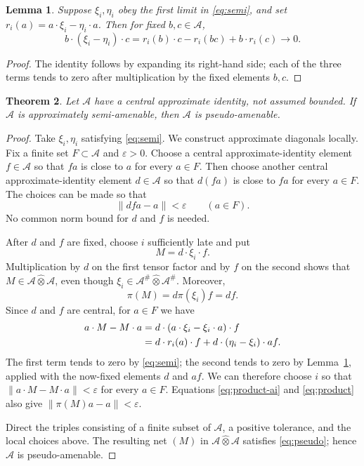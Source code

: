 \documentclass[11pt]{article}
\newtheorem{theorem}{Theorem}[section]
\newtheorem{lemma}[theorem]{Lemma}
\newcommand{\A}{\mathcal A}
\newcommand{\Ah}{\mathcal A^{\#}}
\newcommand{\tp}{\widehat\otimes}
\begin{document}
\begin{lemma}\label{lem:annihilation}
Suppose $\xi_i,\eta_i$ obey the first limit in \eqref{eq:semi}, and set
$r_i(a)=a\cdot\xi_i-\eta_i\cdot a$.  Then for fixed $b,c\in\A$,
\begin{equation}\label{eq:annihilation}
 b\cdot(\xi_i-\eta_i)\cdot c
 =r_i(b)\cdot c-r_i(bc)+b\cdot r_i(c)\longrightarrow0.
\end{equation}
\end{lemma}
\begin{proof}
The identity follows by expanding its right-hand side; each of the three
terms tends to zero after multiplication by the fixed elements $b,c$.
\end{proof}

\begin{theorem}\label{thm:converse}
Let $\A$ have a central approximate identity, not assumed bounded.  If $\A$
is approximately semi-amenable, then $\A$ is pseudo-amenable.
\end{theorem}
\begin{proof}
Take $\xi_i,\eta_i$ satisfying \eqref{eq:semi}.  We construct approximate
diagonals locally.  Fix a finite set $F\subset\A$ and $\varepsilon>0$.
Choose a central approximate-identity element $f\in\A$ so that $fa$ is close
to $a$ for every $a\in F$.  Then choose another central
approximate-identity element $d\in\A$ so that $d(fa)$ is close to $fa$ for
every $a\in F$.  The choices can be made so that
\begin{equation}\label{eq:product-ai}
 \|dfa-a\|<\varepsilon\qquad(a\in F).
\end{equation}
No common norm bound for $d$ and $f$ is needed.

After $d$ and $f$ are fixed, choose $i$ sufficiently late and put
\[
 M=d\cdot\xi_i\cdot f.
\]
Multiplication by $d$ on the first tensor factor and by $f$ on the second
shows that $M\in\A\tp\A$, even though $\xi_i\in\Ah\tp\Ah$.  Moreover,
\begin{equation}\label{eq:product}
 \pi(M)=d\pi(\xi_i)f=df.
\end{equation}
Since $d$ and $f$ are central, for $a\in F$ we have
\begin{align}
 a\cdot M-M\cdot a
 &=d\cdot(a\cdot\xi_i-\xi_i\cdot a)\cdot f\notag\\
 &=d\cdot r_i(a)\cdot f
   +d\cdot(\eta_i-\xi_i)\cdot af.\label{eq:commutator}
\end{align}
The first term tends to zero by \eqref{eq:semi}; the second tends to zero by
Lemma~\ref{lem:annihilation}, applied with the now-fixed elements $d$ and
$af$.  We can therefore choose $i$ so that
$\|a\cdot M-M\cdot a\|<\varepsilon$ for every $a\in F$.  Equations
\eqref{eq:product-ai} and \eqref{eq:product} also give
$\|\pi(M)a-a\|<\varepsilon$.

Direct the triples consisting of a finite subset of $\A$, a positive
tolerance, and the local choices above.  The resulting net $(M)$ in
$\A\tp\A$ satisfies \eqref{eq:pseudo}; hence $\A$ is pseudo-amenable.
\end{proof}
\end{document}
